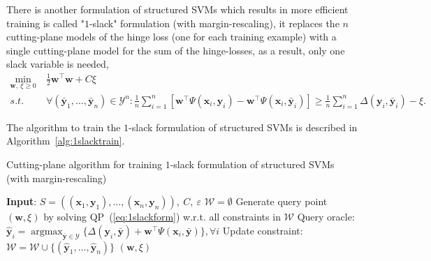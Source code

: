 \documentclass[10pt,a4paper]{article}
\DeclareMathOperator*{\argmax}{argmax}
\begin{document}
There is another formulation of structured SVMs which results in more efficient training is called "$1$-slack" formulation (with margin-rescaling),
it replaces the $n$ cutting-plane models of the hinge loss (one for each training example) with a single cutting-plane model for 
the sum of the hinge-losses, as a result, only one slack variable is needed,
\begin{equation}
\label{eq:1slackform}
\begin{aligned}
\min_{\mathbf{w}, ~\xi \ge 0} ~& \frac{1}{2} \mathbf{w}^\top \mathbf{w} + C \xi \\
s.t.~~ ~& \forall(\bar{\mathbf{y}}_1, \dots, \bar{\mathbf{y}}_n) \in \mathcal{Y}^n: 
          \frac{1}{n} \sum_{i=1}^n [ \mathbf{w}^\top \Psi(\mathbf{x}_i, \mathbf{y}_i) - \mathbf{w}^\top \Psi(\mathbf{x}_i, \bar{\mathbf{y}}_i) ] \ge
          \frac{1}{n} \sum_{i=1}^n \Delta(\mathbf{y}_i, \bar{\mathbf{y}}_i) - \xi.
\end{aligned}
\end{equation}

The algorithm to train the $1$-slack formulation of structured SVMs is described in Algorithm~\ref{alg:1slacktrain}.

\begin{algorithm}[htbp]
\caption{Cutting-plane algorithm for training $1$-slack formulation of structured SVMs (with margin-rescaling)}
\label{alg:1slacktrain}
\begin{algorithmic}[1]
\STATE \textbf{Input}: $S = \left( (\mathbf{x}_1, \mathbf{y}_1), \dots, (\mathbf{x}_n, \mathbf{y}_n) \right),~ C,~ \varepsilon$
\STATE $\mathcal{W} = \emptyset$
\REPEAT
    \STATE Generate query point $(\mathbf{w}, \xi)$ by solving QP~(\ref{eq:1slackform}) w.r.t. all constraints in $\mathcal{W}$
    \STATE Query oracle: $\hat{\mathbf{y}}_i = \argmax_{\bar{\mathbf{y}} \in \mathcal{Y}} \{ \Delta(\mathbf{y}_i, \bar{\mathbf{y}}) + 
           \mathbf{w}^\top \Psi(\mathbf{x}_i, \bar{\mathbf{y}}) \}, \forall i$
    \STATE Update constraint: $\mathcal{W} = \mathcal{W} \cup \{ (\hat{\mathbf{y}}_1, \dots, \hat{\mathbf{y}}_n) \}$
\RETURN $(\mathbf{w}, \xi)$
\end{algorithmic}
\end{algorithm}
\end{document}
